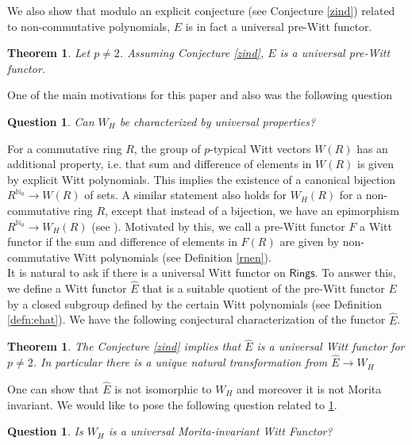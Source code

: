 \documentclass[11pt]{amsart}
\theoremstyle{plain}
\newtheorem{theorem}[thm]{Theorem}
\newtheorem{question}[thm]{Question}
\theoremstyle{definition}
\newcommand{\N}{{\mathbb N}}
\newcommand{\Rings}{{\mathsf{Rings}}}
\begin{document}
\noindent We also show that modulo an explicit conjecture (see Conjecture \ref{zind}) related to non-commutative polynomials, $E$ is in fact a universal pre-Witt functor. 
\begin{theorem}\label{main2}
Let $p \neq 2$. Assuming Conjecture \ref{zind}, $E$ is a universal pre-Witt functor.  
\end{theorem}

\noindent One of the main motivations for this paper and also \cite{ps} was the following question 

\begin{question} \label{question:w_h} Can $W_H$ be characterized by universal properties? 
\end{question}

\noindent For a commutative ring $R$, the group of $p$-typical Witt vectors $W(R)$ has an additional property, i.e. that sum and difference of elements in $W(R)$ is given by explicit Witt polynomials. This implies the existence of a canonical bijection $R^{\N_0} \to W(R)$ of sets. A similar statement also holds for $W_H(R)$ for a non-commutative ring $R$, except that instead of a bijection, we have an epimorphism $R^{\N_0}\to W_H(R)$ (see \cite[Page 56]{h2}). Motivated by this, we call a pre-Witt functor $F$ a Witt functor if the sum and difference of elements in $F(R)$ are given by non-commutative Witt polynomials (see Definition \ref{rnen}). \\

\vspace{1mm}
\noindent It is natural to ask if there is a universal Witt functor on $\Rings$. To answer this, we define a Witt functor $\hat{E}$ that is a suitable quotient of the pre-Witt functor $E$ by a closed subgroup defined by the certain Witt polynomials (see Definition \ref{defn:ehat}). We have the following conjectural characterization of the functor $\hat{E}$.

\begin{theorem}\label{ehatuniversal}
The Conjecture \ref{zind} implies that  $\hat{E}$ is a universal Witt functor for $p\neq 2$. In particular there is a unique natural transformation from $\hat{E}\to W_H$ 
\end{theorem} 

\noindent One can show that $\hat{E}$ is not isomorphic to $W_H$ and moreover it is not Morita invariant. We would like to pose the following question related to \ref{question:w_h}.
\begin{question}
Is  $W_H$ is a universal Morita-invariant Witt Functor?
\end{question}
\vspace{2mm}
\end{document}
